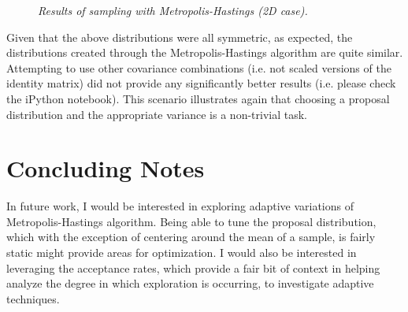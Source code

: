\documentclass{article} %
\begin{document}
\begin{figure}
{            \label{fig:right}%
        }
    \caption{\textit{Results of sampling with Metropolis-Hastings (2D case).}}
    \label{fig:default}
\end{figure}

Given that the above distributions were all symmetric, as expected, the distributions created through the Metropolis-Hastings algorithm are quite similar. Attempting to use other covariance combinations (i.e. not  scaled versions of the identity matrix) did not provide any significantly better results (i.e. please check the iPython notebook). This scenario illustrates again that choosing a proposal distribution and the appropriate variance is a non-trivial task.

\section{Concluding Notes}

In future work, I would be interested in exploring adaptive variations of Metropolis-Hastings algorithm. Being able to tune the proposal distribution, which with the exception of centering around the mean of a sample, is fairly static might provide areas for optimization. I would also be interested in leveraging the acceptance rates, which provide a fair bit of context in helping analyze the degree in which exploration is occurring, to investigate adaptive techniques.
\end{document}
